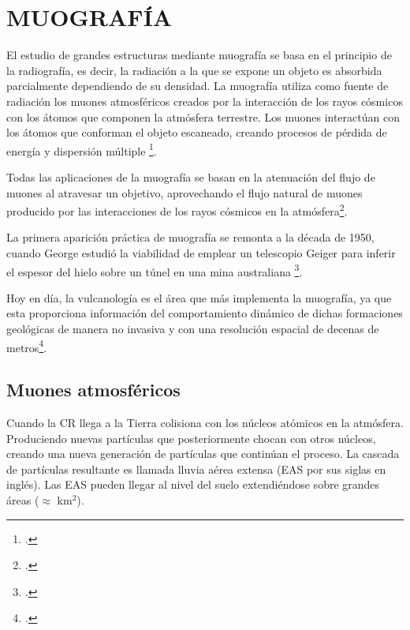 \chapter{ \MakeUppercase{MUOGRAFÍA}}
\label{ch:c_rays}

El estudio de grandes estructuras mediante muografía se basa en el principio de la radiografía, es decir, la radiación a la que se expone un objeto es absorbida parcialmente dependiendo de su densidad. La muografía utiliza como fuente de radiación los muones atmosféricos creados por la interacción de los rayos cósmicos con los átomos que componen la atmósfera terrestre. Los muones interactúan con los átomos que conforman el objeto escaneado, creando procesos de pérdida de energía y dispersión múltiple \footcite{procureur2018muon}.

Todas las aplicaciones de la muografía se basan en la atenuación del flujo de muones al atravesar un objetivo, aprovechando el flujo natural de muones producido por las interacciones de los rayos cósmicos en la atmósfera\footcite{bonechi2020atmospheric}.

La primera aparición práctica de muografía se remonta a la década de 1950, cuando George estudió la viabilidad de emplear un telescopio Geiger para inferir el espesor del hielo sobre un túnel en una mina australiana \footcite{george1955cosmic}.

Hoy en día, la vulcanología es el área que más implementa la muografía, ya que esta proporciona información del comportamiento dinámico de dichas formaciones geológicas de manera no invasiva y con una resolución espacial de decenas de metros\footcite{Tanaka2005}.
  
 
\section{Muones atmosféricos}
Cuando la CR llega a la Tierra colisiona con los núcleos atómicos en la atmósfera. Produciendo nuevas partículas que posteriormente chocan con otros núcleos, creando una nueva generación de partículas que continúan el proceso. La cascada de partículas resultante es llamada lluvia aérea extensa (EAS por sus siglas en inglés). Las EAS pueden llegar al nivel del suelo extendiéndose sobre grandes áreas ($\approx$ km$^{2}$).
 
